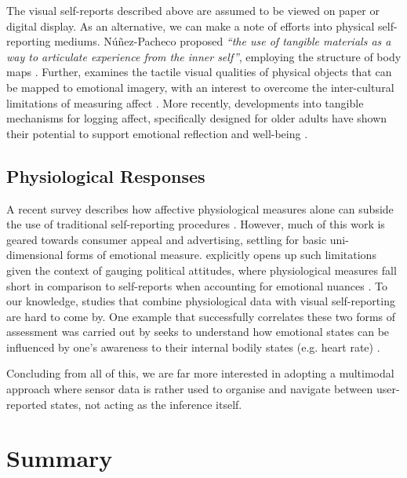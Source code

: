 The visual self-reports described above are assumed to be viewed on paper or digital display. As an alternative, we can make a note of efforts into physical self-reporting mediums. Núñez-Pacheco proposed \textit{“the use of tangible materials as a way to articulate experience from the inner self”}, employing the structure of body maps \cite{nunez-pacheco_tangible_2021}. Further, \citeauthor{isbister_sensual_2007} examines the tactile visual qualities of physical objects that can be mapped to emotional imagery, with an interest to overcome the inter-cultural limitations of measuring affect \cite{isbister_sensual_2007}. More recently, developments into tangible mechanisms for logging affect, specifically designed for older adults have shown their potential to support emotional reflection and well-being \cite{gooch_designing_2022}.

\subsection*{Physiological Responses}
A recent survey describes how affective physiological measures alone can subside the use of traditional self-reporting procedures \cite{barker_self-report_2016}. However, much of this work is geared towards consumer appeal and advertising, settling for basic uni-dimensional forms of emotional measure. \citeauthor{ciuk_measuring_2015} explicitly opens up such limitations given the context of gauging political attitudes, where physiological measures fall short in comparison to self-reports when accounting for emotional nuances \cite{ciuk_measuring_2015}. To our knowledge, studies that combine physiological data with visual self-reporting are hard to come by. One example that successfully correlates these two forms of assessment was carried out by \citeauthor{jung_role_2017} seeks to understand how emotional states can be influenced by one's awareness to their internal bodily states (e.g. heart rate) \cite{jung_role_2017}.

Concluding from all of this, we are far more interested in adopting a multimodal approach where sensor data is rather used to organise and navigate between user-reported states, not acting as the inference itself.


\section{Summary}
\label{lit_review:conclusion}

